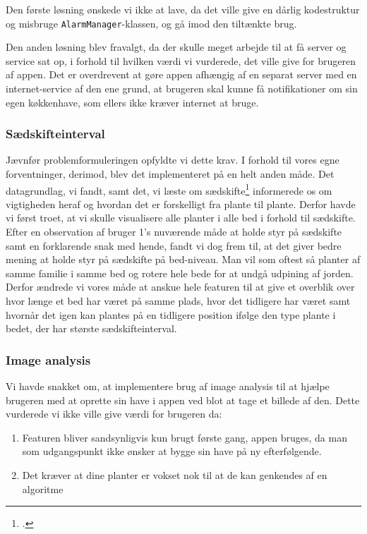 Den første løsning ønskede vi ikke at lave, da det ville give en dårlig kodestruktur og misbruge \texttt{AlarmManager}-klassen, og gå imod den tiltænkte brug.

Den anden løsning blev fravalgt, da der skulle meget arbejde til at få server og service sat op, i forhold til hvilken værdi vi vurderede, det ville give for brugeren af appen. Det er overdrevent at gøre appen afhængig af en separat server med en internet-service af den ene grund, at brugeren skal kunne få notifikationer om sin egen køkkenhave, som ellers ikke kræver internet at bruge.

\subsubsection{Sædskifteinterval}
Jævnfør problemformuleringen opfyldte vi dette krav. I forhold til vores egne forventninger, derimod, blev det implementeret på en helt anden måde. Det datagrundlag, vi fandt, samt det, vi læste om sædskifte\footcite{sædskifte} informerede os om vigtigheden heraf og hvordan det er forskelligt fra plante til plante. Derfor havde vi først troet, at vi skulle visualisere alle planter i alle bed i forhold til sædskifte. Efter en observation af bruger 1's nuværende måde at holde styr på sædskifte samt en forklarende snak med hende, fandt vi dog frem til, at det giver bedre mening at holde styr på sædskifte på bed-niveau. Man vil som oftest så planter af samme familie i samme bed og rotere hele bede for at undgå udpining af jorden. Derfor ændrede vi vores måde at anskue hele featuren til at give et overblik over hvor længe et bed har været på samme plads, hvor det tidligere har været samt hvornår det igen kan plantes på en tidligere position ifølge den type plante i bedet, der har største sædskifteinterval.

\subsubsection{Image analysis}
\label{image-analysis}
Vi havde snakket om, at implementere brug af image analysis til at hjælpe brugeren med at oprette sin have i appen ved blot at tage et billede af den. Dette vurderede vi ikke ville give værdi for brugeren da:
\begin{enumerate}
        \item Featuren bliver sandsynligvis kun brugt første gang, appen bruges, da man som udgangspunkt ikke ønsker at bygge sin have på ny efterfølgende. 
        \item Det kræver at dine planter er vokset nok til at de kan genkendes af en algoritme
\end{enumerate}

